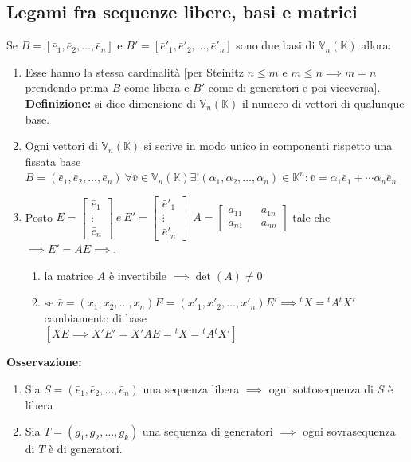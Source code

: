 \documentclass{article}
\newcommand{\s}[2]{#1_1, #1_2, \ldots, #1_{#2}}
\newcommand{\Vx}[1]{\mathbb{V}_#1 (\mathbb{K})}
\newcommand{\ah}{\alpha}
\begin{document}
\subsection{Legami fra sequenze libere, basi e matrici}
Se $B=[\s{\bar{e}}{n}]$ e $B'=[\s{\bar{e}'}{n}]$ sono due basi di $\Vx{n}$
allora:
\begin{enumerate}
    \item Esse hanno la stessa cardinalità [per Steinitz $n\leq m$ e $m\leq n \implies m
              = n$ prendendo prima $B$ come libera e $B'$ come di generatori e poi
          viceversa].\\ \textbf{Definizione:} si dice dimensione di $\Vx{n}$ il numero di
          vettori di qualunque base.
    \item Ogni vettori di $\Vx{n}$ si scrive in modo unico in componenti rispetto una fissata base \\ $B=(\s{\bar e}{n})\ \forall\bar v\in \Vx{n}\exists !(\s{\ah}{n})\in\mathbb{K}^n:\bar v = \ah_1\bar e_1+\cdots\ah_n\bar e_n$
    \item Posto $ E = \begin{bmatrix}\bar e_1 \\ \vdots \\ \bar e_n\end{bmatrix} \ e \ E'=\begin{bmatrix}\bar e'_1 \\ \vdots \\ \bar e'_n\end{bmatrix} \ \ A=\begin{bmatrix}a_{11} && a_{1n} \\ a_{n1} && a_{nn} \end{bmatrix}$ tale che $\implies E'=AE\implies$.
          \begin{enumerate}
              \item la matrice $A$ è invertibile $\implies \det(A)\ne0$
              \item se $\bar v=(\s{x}{n})E=(\s{x'}{n})E'\implies {^{t}X} = {^{t}A}{^{t}X'}$ cambiamento di base \\$[XE\implies X'E'=X'AE={^{t}X}={^{t}A}{^{t}X'}]$
          \end{enumerate}
\end{enumerate}
\textbf{Osservazione:}\begin{enumerate}
    \item Sia $S= (\s{\bar e}{n})$ una sequenza libera $\implies$ ogni sottosequenza di $S$ è libera
    \item Sia $T= (\s{g}{k})$ una sequenza di generatori $\implies$ ogni sovrasequenza di $T$ è di generatori.
\end{enumerate}
\end{document}
